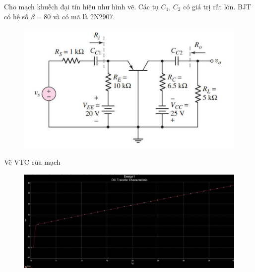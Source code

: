 
 Cho mạch khuếch đại tín hiệu như hình vẽ. Các tụ $C_{1}$, $C_{2}$ có giá trị rất lớn. BJT có hệ số $\beta = 80$ và có mã là 2N2907.
 
 \begin{figure}[H]
 	\centering
	\includegraphics[width=.8\linewidth]{./my-chapters/my-images/Question2/debai.png}
 \end{figure}
 

Vẽ VTC của mạch

\begin{figure}[H]
	\centering
	\includegraphics[width=.9\linewidth]{./my-chapters/my-images/Question2/a_VTC.png}
\end{figure}

